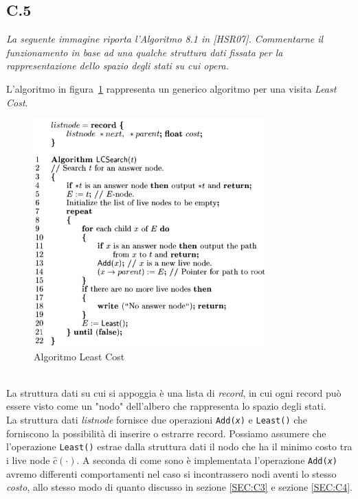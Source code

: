 \documentclass[a4paper]{article}
\begin{document}
\subsection{C.5}
\emph{La seguente immagine riporta l'Algoritmo 8.1 in [HSR07]. Commentarne il funzionamento in base ad una qualche struttura dati fissata per la rappresentazione dello spazio degli stati su cui opera.}


L'algoritmo in figura~\ref{FIG:C5} rappresenta un generico algoritmo per una visita \textit{Least Cost}.\\
\begin{figure}[!ht]
\centering
\includegraphics[width=0.8\textwidth]{./img/C5.png}
\caption{Algoritmo Least Cost} \label{FIG:C5}
\end{figure}\\
La struttura dati su cui si appoggia è una lista di \textit{record}, in cui ogni record può essere visto come un "nodo" dell'albero che rappresenta lo spazio degli stati.\\
La struttura dati \textit{listnode} fornisce due operazioni \texttt{Add(\textit{x})} e \texttt{Least()} che forniscono la possibilità di inserire o estrarre record.
Possiamo assumere che l'operazione \texttt{Least()} estrae dalla struttura dati il nodo che ha il minimo costo tra i live node $ \hat c(\cdot)$.
A seconda di come sono è implementata l'operazione \texttt{Add(\textit{x})} avremo differenti comportamenti nel caso si incontrassero nodi aventi lo stesso \textit{costo}, allo stesso modo di quanto discusso in sezione \ref{SEC:C3} e sezione \ref{SEC:C4}.
\end{document}
